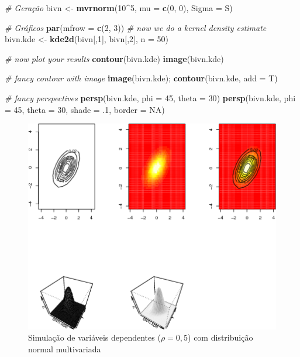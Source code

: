 \documentclass[a4paper]{article}
\newenvironment{Shaded}{\begin{snugshade}}{\end{snugshade}}
\newcommand{\KeywordTok}[1]{\textcolor[rgb]{0.13,0.29,0.53}{\textbf{#1}}}
\newcommand{\DataTypeTok}[1]{\textcolor[rgb]{0.13,0.29,0.53}{#1}}
\newcommand{\DecValTok}[1]{\textcolor[rgb]{0.00,0.00,0.81}{#1}}
\newcommand{\StringTok}[1]{\textcolor[rgb]{0.31,0.60,0.02}{#1}}
\newcommand{\CommentTok}[1]{\textcolor[rgb]{0.56,0.35,0.01}{\textit{#1}}}
\newcommand{\OtherTok}[1]{\textcolor[rgb]{0.56,0.35,0.01}{#1}}
\newcommand{\OperatorTok}[1]{\textcolor[rgb]{0.81,0.36,0.00}{\textbf{#1}}}
\newcommand{\NormalTok}[1]{#1}
\begin{document}

\begin{Shaded}
\begin{Highlighting}[]
\CommentTok{# Geração}
\NormalTok{bivn <-}\StringTok{ }\KeywordTok{mvrnorm}\NormalTok{(}\DecValTok{10}\OperatorTok{^}\DecValTok{5}\NormalTok{, }\DataTypeTok{mu =} \KeywordTok{c}\NormalTok{(}\DecValTok{0}\NormalTok{, }\DecValTok{0}\NormalTok{), }\DataTypeTok{Sigma =}\NormalTok{  S)}

\CommentTok{# Gráficos}
\KeywordTok{par}\NormalTok{(}\DataTypeTok{mfrow =} \KeywordTok{c}\NormalTok{(}\DecValTok{2}\NormalTok{, }\DecValTok{3}\NormalTok{))}
\CommentTok{# now we do a kernel density estimate}
\NormalTok{bivn.kde <-}\StringTok{ }\KeywordTok{kde2d}\NormalTok{(bivn[,}\DecValTok{1}\NormalTok{], bivn[,}\DecValTok{2}\NormalTok{], }\DataTypeTok{n =} \DecValTok{50}\NormalTok{)}

\CommentTok{# now plot your results}
\KeywordTok{contour}\NormalTok{(bivn.kde)}
\KeywordTok{image}\NormalTok{(bivn.kde)}

\CommentTok{# fancy contour with image}
\KeywordTok{image}\NormalTok{(bivn.kde); }\KeywordTok{contour}\NormalTok{(bivn.kde, }\DataTypeTok{add =}\NormalTok{ T)}

\CommentTok{# fancy perspectives}
\KeywordTok{persp}\NormalTok{(bivn.kde, }\DataTypeTok{phi =} \DecValTok{45}\NormalTok{, }\DataTypeTok{theta =} \DecValTok{30}\NormalTok{)}
\KeywordTok{persp}\NormalTok{(bivn.kde, }\DataTypeTok{phi =} \DecValTok{45}\NormalTok{, }\DataTypeTok{theta =} \DecValTok{30}\NormalTok{, }\DataTypeTok{shade =}\NormalTok{ .}\DecValTok{1}\NormalTok{, }\DataTypeTok{border =} \OtherTok{NA}\NormalTok{)}
\end{Highlighting}
\end{Shaded}

\begin{figure}[H]

{\centering \includegraphics[width=0.7\linewidth]{images/mvnormdep-1} 

}

\caption{Simulação de variáveis dependentes ($\rho = 0,5$) com distribuição normal multivariada}\label{fig:mvnormdep}
\end{figure}
\end{document}
